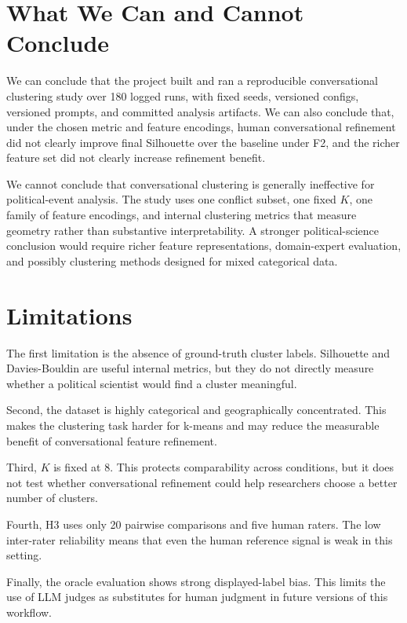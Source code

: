 \documentclass[11pt,a4paper]{article}
\begin{document}
\section{What We Can and Cannot Conclude}

We can conclude that the project built and ran a reproducible conversational clustering study over 180 logged runs, with fixed seeds, versioned configs, versioned prompts, and committed analysis artifacts. We can also conclude that, under the chosen metric and feature encodings, human conversational refinement did not clearly improve final Silhouette over the baseline under F2, and the richer feature set did not clearly increase refinement benefit.

We cannot conclude that conversational clustering is generally ineffective for political-event analysis. The study uses one conflict subset, one fixed $K$, one family of feature encodings, and internal clustering metrics that measure geometry rather than substantive interpretability. A stronger political-science conclusion would require richer feature representations, domain-expert evaluation, and possibly clustering methods designed for mixed categorical data.

\section{Limitations}

The first limitation is the absence of ground-truth cluster labels. Silhouette and Davies-Bouldin are useful internal metrics, but they do not directly measure whether a political scientist would find a cluster meaningful.

Second, the dataset is highly categorical and geographically concentrated. This makes the clustering task harder for k-means and may reduce the measurable benefit of conversational feature refinement.

Third, $K$ is fixed at 8. This protects comparability across conditions, but it does not test whether conversational refinement could help researchers choose a better number of clusters.

Fourth, H3 uses only 20 pairwise comparisons and five human raters. The low inter-rater reliability means that even the human reference signal is weak in this setting.

Finally, the oracle evaluation shows strong displayed-label bias. This limits the use of LLM judges as substitutes for human judgment in future versions of this workflow.
\end{document}
